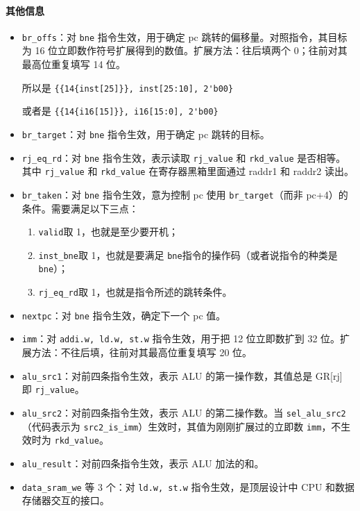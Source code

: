\documentclass[UTF8]{ctexart}
\begin{document}
\paragraph{其他信息}
\begin{itemize}[itemsep=2pt, parsep=3pt]
    \item \verb!br_offs!：对 \verb!bne! 指令生效，用于确定 pc 跳转的偏移量。对照指令，其目标为 16 位立即数作符号扩展得到的数值。扩展方法：往后填两个 0；往前对其最高位重复填写 14 位。

    所以是 \verb!{{14{inst[25]}}, inst[25:10], 2'b00}!

    或者是 \verb!{{14{i16[15]}}, i16[15:0], 2'b00}!

    \item \verb!br_target!：对 \verb!bne! 指令生效，用于确定 pc 跳转的目标。
    \item \verb!rj_eq_rd!：对 \verb!bne! 指令生效，表示读取 \verb!rj_value! 和 \verb!rkd_value! 是否相等。其中 \verb!rj_value! 和 \verb!rkd_value! 在寄存器黑箱里面通过 raddr1 和 raddr2 读出。
    \item \verb!br_taken!：对 \verb!bne! 指令生效，意为控制 pc 使用 \verb!br_target!（而非 pc+4）的条件。需要满足以下三点：
        \begin{enumerate}
            \item \verb!valid!取 1，也就是至少要开机；
            \item \verb!inst_bne!取 1，也就是要满足 \verb!bne!指令的操作码（或者说指令的种类是 \verb!bne!）；
            \item \verb!rj_eq_rd!取 1，也就是指令所述的跳转条件。
        \end{enumerate}
    \item \verb!nextpc!：对 \verb!bne! 指令生效，确定下一个 pc 值。
    \item \verb!imm!：对 \verb!addi.w, ld.w, st.w! 指令生效，用于把 12 位立即数扩到 32 位。扩展方法：不往后填，往前对其最高位重复填写 20 位。
    \item \verb!alu_src1!：对前四条指令生效，表示 ALU 的第一操作数，其值总是 GR[rj] 即 \verb!rj_value!。
    \item \verb!alu_src2!：对前四条指令生效，表示 ALU 的第二操作数。当 \verb!sel_alu_src2!（代码表示为 \verb!src2_is_imm!）生效时，其值为刚刚扩展过的立即数 \verb!imm!，不生效时为 \verb!rkd_value!。
    \item \verb!alu_result!：对前四条指令生效，表示 ALU 加法的和。
    \item \verb!data_sram_we! 等 3 个：对 \verb!ld.w, st.w! 指令生效，是顶层设计中 CPU 和数据存储器交互的接口。

\end{itemize}
\end{document}
